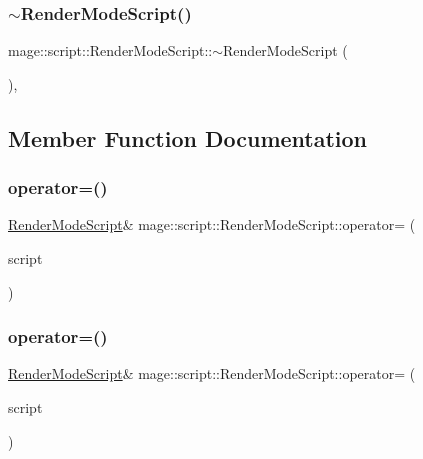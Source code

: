 \subsubsection{\texorpdfstring{$\sim$\+Render\+Mode\+Script()}{~RenderModeScript()}}
{\footnotesize\ttfamily mage\+::script\+::\+Render\+Mode\+Script\+::$\sim$\+Render\+Mode\+Script (\begin{DoxyParamCaption}{ }\end{DoxyParamCaption})\hspace{0.3cm}{\ttfamily [virtual]}, {\ttfamily [default]}}



\subsection{Member Function Documentation}
\hypertarget{classmage_1_1script_1_1_render_mode_script_af735235c25858295c4e5e23586b19f20}{}\label{classmage_1_1script_1_1_render_mode_script_af735235c25858295c4e5e23586b19f20} 
\subsubsection{\texorpdfstring{operator=()}{operator=()}\hspace{0.1cm}{\footnotesize\ttfamily [1/2]}}
{\footnotesize\ttfamily \hyperlink{classmage_1_1script_1_1_render_mode_script}{Render\+Mode\+Script}\& mage\+::script\+::\+Render\+Mode\+Script\+::operator= (\begin{DoxyParamCaption}\item[{const \hyperlink{classmage_1_1script_1_1_render_mode_script}{Render\+Mode\+Script} \&}]{script }\end{DoxyParamCaption})\hspace{0.3cm}{\ttfamily [delete]}}

\hypertarget{classmage_1_1script_1_1_render_mode_script_a75affa0757f3ad8603d6437e48732ab4}{}\label{classmage_1_1script_1_1_render_mode_script_a75affa0757f3ad8603d6437e48732ab4} 
\subsubsection{\texorpdfstring{operator=()}{operator=()}\hspace{0.1cm}{\footnotesize\ttfamily [2/2]}}
{\footnotesize\ttfamily \hyperlink{classmage_1_1script_1_1_render_mode_script}{Render\+Mode\+Script}\& mage\+::script\+::\+Render\+Mode\+Script\+::operator= (\begin{DoxyParamCaption}\item[{\hyperlink{classmage_1_1script_1_1_render_mode_script}{Render\+Mode\+Script} \&\&}]{script }\end{DoxyParamCaption})\hspace{0.3cm}{\ttfamily [delete]}}

